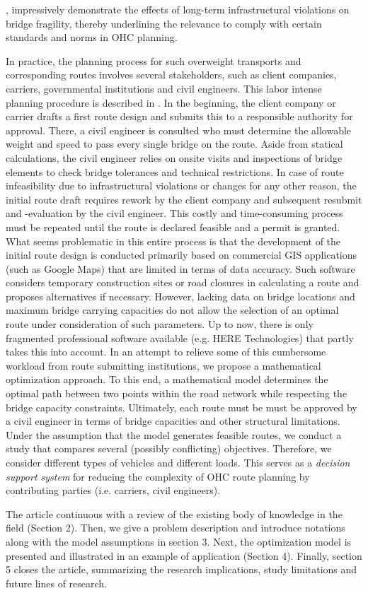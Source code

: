 \cite{Morgese.2020, MorandiNYTimes}, impressively demonstrate the effects of long-term infrastructural violations on bridge fragility, thereby underlining the relevance to comply with certain standards and norms in OHC planning.
\par In practice, the planning process for such overweight transports and corresponding routes involves several stakeholders, such as client companies, carriers, governmental institutions and civil engineers. This labor intense planning procedure is described in \cite{Osegueda.1999}. In the beginning, the client company or carrier drafts a first route design and submits this to a responsible authority for approval. There, a civil engineer is consulted who must determine the allowable weight and speed to pass every single bridge on the route. Aside from statical calculations, the civil engineer relies on onsite visits and inspections of bridge elements to check bridge tolerances and technical restrictions. In case of route infeasibility due to infrastructural violations or changes for any other reason, the initial route draft requires rework by the client company and subsequent resubmit and -evaluation by the civil engineer. This costly and time-consuming process must be repeated until the route is declared feasible and a permit is granted. What seems problematic in this entire process is that the development of the initial route design is conducted primarily based on commercial GIS applications (such as Google Maps) that are limited in terms of data accuracy. Such software considers temporary construction sites or road closures in calculating a route and proposes alternatives if necessary. However, lacking data on bridge locations and maximum bridge carrying capacities do not allow the selection of an optimal route under consideration of such parameters. Up to now, there is only fragmented professional software available (e.g. HERE Technologies) that partly takes this into account. In an attempt to relieve some of this cumbersome workload from route submitting institutions, we propose a mathematical optimization approach. To this end, a mathematical model determines the optimal path between two points within the road network while respecting the bridge capacity constraints. Ultimately, each route must be must be approved by a civil engineer in terms of bridge capacities and other structural limitations. Under the assumption that the model generates feasible routes, we conduct a study that compares several (possibly conflicting) objectives. Therefore, we consider different types of vehicles and different loads. This serves as a \textit{decision support system} for reducing the complexity of OHC route planning by contributing parties (i.e. carriers, civil engineers).
\par The article continuous with a review of the existing body of knowledge in the field (Section 2). Then, we give a problem description and introduce notations along with the model assumptions in section 3. Next, the optimization model is presented and illustrated in an example of application (Section 4). Finally, section 5 closes the article, summarizing the research implications, study limitations and future lines of research.


